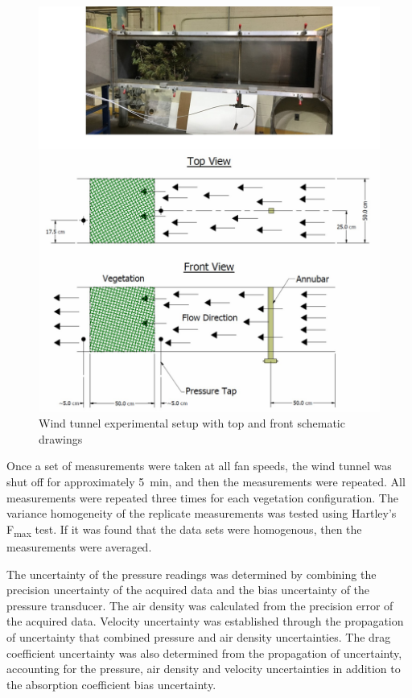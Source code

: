 \documentclass[12pt]{article}
\begin{document}
\begin{figure} [!]
	\centering 	
    \includegraphics[width=\textwidth,keepaspectratio]{Picture6a.jpg}
	\caption[Wind tunnel experimental setup]{Wind tunnel experimental setup with top and front schematic drawings }
	\label{fig:WindtunnelPic}
\end{figure}


Once a set of measurements were taken at all fan speeds, the wind tunnel was shut off for approximately 5~\si{min}, and then the measurements were repeated. All measurements were repeated three times for each vegetation configuration. The variance homogeneity of the replicate measurements was tested using Hartley's F\textsubscript{max} test. If it was found that the data sets were homogenous, then the measurements were averaged.

The uncertainty of the pressure readings was determined by combining the precision uncertainty of the acquired data and the bias uncertainty of the pressure transducer. The air density was calculated from the precision error of the acquired data. Velocity uncertainty was established through the propagation of uncertainty that combined pressure and air density uncertainties. The drag coefficient uncertainty was also determined from the propagation of uncertainty, accounting for the pressure, air density and velocity uncertainties in addition to the absorption coefficient bias uncertainty.
\end{document}
